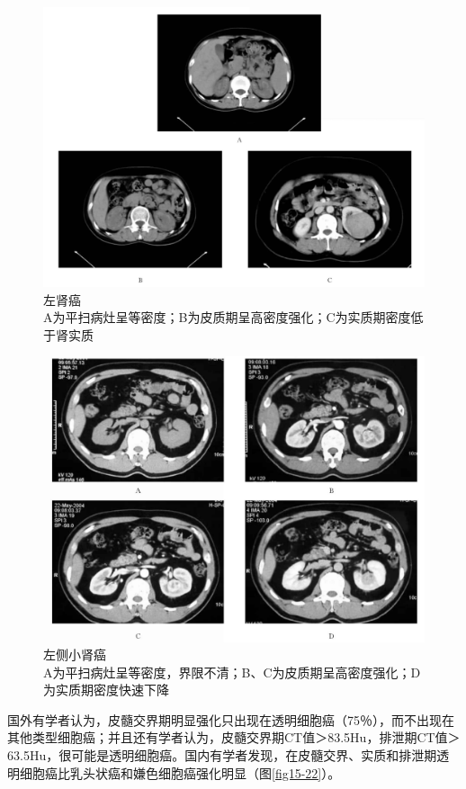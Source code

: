\begin{figure}[!htbp]
 \centering
 \includegraphics[width=.7\textwidth,height=\textheight,keepaspectratio]{./images/Image00337.jpg}
 \captionsetup{justification=centering}
 \caption{左肾癌\\{\small A为平扫病灶呈等密度；B为皮质期呈高密度强化；C为实质期密度低于肾实质}}
 \label{fig15-20}
  \end{figure} 

\begin{figure}[!htbp]
 \centering
 \includegraphics[width=.7\textwidth,height=\textheight,keepaspectratio]{./images/Image00338.jpg}
 \captionsetup{justification=centering}
 \caption{左侧小肾癌\\{\small A为平扫病灶呈等密度，界限不清；B、C为皮质期呈高密度强化；D为实质期密度快速下降}}
 \label{fig15-21}
  \end{figure} 

国外有学者认为，皮髓交界期明显强化只出现在透明细胞癌（75％），而不出现在其他类型细胞癌；并且还有学者认为，皮髓交界期CT值＞83.5Hu，排泄期CT值＞63.5Hu，很可能是透明细胞癌。国内有学者发现，在皮髓交界、实质和排泄期透明细胞癌比乳头状癌和嫌色细胞癌强化明显（图\ref{fig15-22}）。

